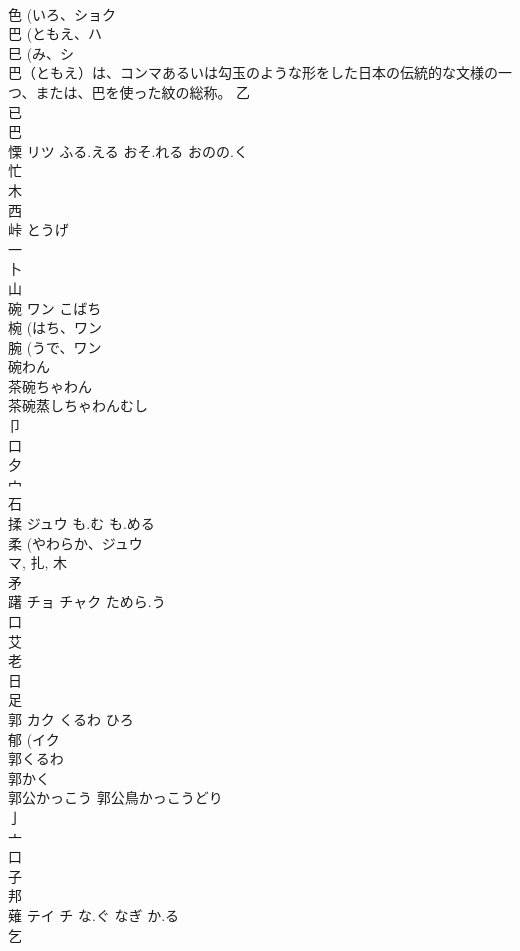 \documentclass[8pt]{extreport}
\begin{document}
\begin{CJK}{UTF8}{min}
\\	色 (いろ、ショク 
\\	巴 (ともえ、ハ 
\\	巳 (み、シ 
\\	巴（ともえ）は、コンマあるいは勾玉のような形をした日本の伝統的な文様の一つ、または、巴を使った紋の総称。			乙 
\\	已 
\\	巴 
\\	慄	リツ	ふる.える おそ.れる おのの.く	
\\	忙 
\\	木 
\\	西 
\\	峠		とうげ	
\\	一 
\\	卜 
\\	山 
\\	碗	ワン	こばち	
\\	椀 (はち、ワン 
\\	腕 (うで、ワン 
\\	碗わん 
\\	茶碗ちゃわん 
\\	茶碗蒸しちゃわんむし 
\\	卩 
\\	口 
\\	夕 
\\	宀 
\\	石 
\\	揉	ジュウ	も.む も.める	
\\	柔 (やわらか、ジュウ 
\\	マ, 扎, 木 
\\	矛 
\\	躇	チョ チャク	ためら.う	
\\	口 
\\	艾 
\\	老 
\\	日 
\\	足 
\\	郭	カク	くるわ ひろ	
\\	郁 (イク 
\\	郭くるわ 
\\	郭かく 
\\	郭公かっこう 郭公鳥かっこうどり 
\\	亅 
\\	亠 
\\	口 
\\	子 
\\	邦 
\\	薙	テイ チ	な.ぐ なぎ か.る	
\\	乞 

\end{CJK}
\end{document}
